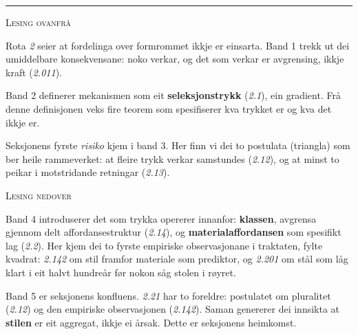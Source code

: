 \documentclass[a4paper,landscape,9pt]{article}
\begin{document}
\begin{center}
\end{center}

\vspace{-0.2em}

\hrule

\vspace{0.4em}

\begin{minipage}[t]{0.325\textwidth}
{\scshape\small Lesing ovanfrå}

Rota \emph{2} seier at fordelinga over formrommet ikkje er einsarta. Band 1 trekk ut dei umiddelbare konsekvensane: noko verkar, og det som verkar er avgrensing, ikkje kraft (\emph{2.011}).

Band 2 definerer mekanismen som eit \textbf{seleksjonstrykk} (\emph{2.1}), ein gradient. Frå denne definisjonen veks fire teorem som spesifiserer kva trykket er og kva det ikkje er.

Seksjonens fyrste \emph{risiko} kjem i band 3. Her finn vi dei to postulata (triangla) som ber heile rammeverket: at fleire trykk verkar samstundes (\emph{2.12}), og at minst to peikar i motstridande retningar (\emph{2.13}).
\end{minipage}\hfill
\begin{minipage}[t]{0.325\textwidth}
{\scshape\small Lesing nedover}

Band 4 introduserer det som trykka opererer innanfor: \textbf{klassen}, avgrensa gjennom delt affordansestruktur (\emph{2.14}), og \textbf{materialaffordansen} som spesifikt lag (\emph{2.2}). Her kjem dei to fyrste empiriske observasjonane i traktaten, fylte kvadrat: \emph{2.142} om stil framfor materiale som prediktor, og \emph{2.201} om stål som låg klart i eit halvt hundreår før nokon såg stolen i røyret.

Band 5 er seksjonens konfluens. \emph{2.21} har to foreldre: postulatet om pluralitet (\emph{2.12}) og den empiriske observasjonen (\emph{2.142}). Saman genererer dei innsikta at \textbf{stilen} er eit aggregat, ikkje ei årsak. Dette er seksjonens heimkomst.
\end{minipage}\hfill
\end{document}
